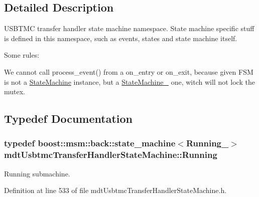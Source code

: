 \subsection{Detailed Description}
U\-S\-B\-T\-M\-C transfer handler state machine namespace. State machine specific stuff is defined in this namespace, such as events, states and state machine itself.

Some rules\-:
\begin{DoxyItemize}
\item We cannot call process\-\_\-event() from a on\-\_\-entry or on\-\_\-exit, because given F\-S\-M is not a \hyperlink{structmdt_usbtmc_transfer_handler_state_machine_1_1_state_machine}{State\-Machine} instance, but a \hyperlink{structmdt_usbtmc_transfer_handler_state_machine_1_1_state_machine__}{State\-Machine\-\_\-} one, witch will not lock the mutex. 
\end{DoxyItemize}

\subsection{Typedef Documentation}
\hypertarget{namespacemdt_usbtmc_transfer_handler_state_machine_abc32bfe633094c8a0764568f294ef3e5}{
\subsubsection[{Running}]{\setlength{\rightskip}{0pt plus 5cm}typedef boost\-::msm\-::back\-::state\-\_\-machine$<${\bf Running\-\_\-}$>$ {\bf mdt\-Usbtmc\-Transfer\-Handler\-State\-Machine\-::\-Running}}}\label{namespacemdt_usbtmc_transfer_handler_state_machine_abc32bfe633094c8a0764568f294ef3e5}


Running submachine. 



Definition at line 533 of file mdt\-Usbtmc\-Transfer\-Handler\-State\-Machine.\-h.

